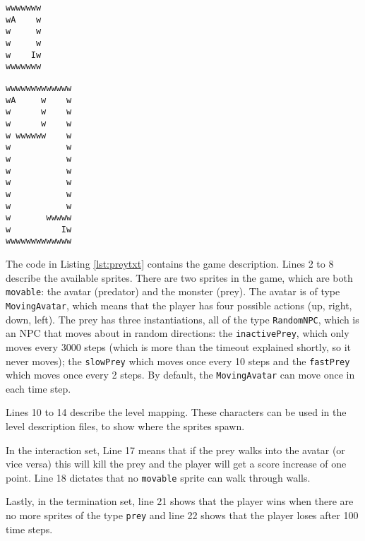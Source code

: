 \begin{minipage}[t]{.4\textwidth}
	\lstset{
		caption=Prey level 1, 
		label=lst:prey1,
		basicstyle=\footnotesize, frame=tb,
		xleftmargin=.1\textwidth, xrightmargin=.1\textwidth
	}
	\begin{lstlisting}
wwwwwww
wA    w
w     w
w     w
w    Iw
wwwwwww
	\end{lstlisting}
\end{minipage}
\begin{minipage}[t]{.5\textwidth}
	\lstset{
		caption=Prey level 2,
		label=lst:prey2,
		basicstyle=\footnotesize, frame=tb,
		xleftmargin=.1\textwidth, xrightmargin=.1\textwidth
	}
	\begin{lstlisting}
wwwwwwwwwwwww
wA     w    w
w      w    w
w      w    w
w wwwwww    w
w           w
w           w
w           w
w           w
w           w
w           w
w       wwwww
w          Iw
wwwwwwwwwwwww
	\end{lstlisting}
\end{minipage}

The code in Listing \ref{lst:preytxt} contains the game description. Lines 2 to
8 describe the available sprites. There are two sprites in the game, which are
both \texttt{movable}: the avatar (predator) and the monster (prey).  The avatar
is of type \texttt{MovingAvatar}, which means that the player has four possible
actions (up, right, down, left). The prey has three instantiations, all of the
type \texttt{RandomNPC}, which is an NPC that moves about in random directions:
the \texttt{inactivePrey}, which only moves every 3000 steps (which is more than
the timeout explained shortly, so it never moves); the \texttt{slowPrey} which
moves once every 10 steps and the \texttt{fastPrey} which moves once every 2
steps.  By default, the \texttt{MovingAvatar} can move once in each time step.

Lines 10 to 14 describe the level mapping. These characters can be used in the
level description files, to show where the sprites spawn. 

In the interaction set, Line 17 means that if the prey walks into the avatar (or
vice versa) this will kill the prey and the player will get a score increase of
one point. Line 18 dictates that no \texttt{movable} sprite can walk through
walls.

Lastly, in the termination set, line 21 shows that the player wins when there
are no more sprites of the type \texttt{prey} and line 22 shows that the player
loses after 100 time steps.

